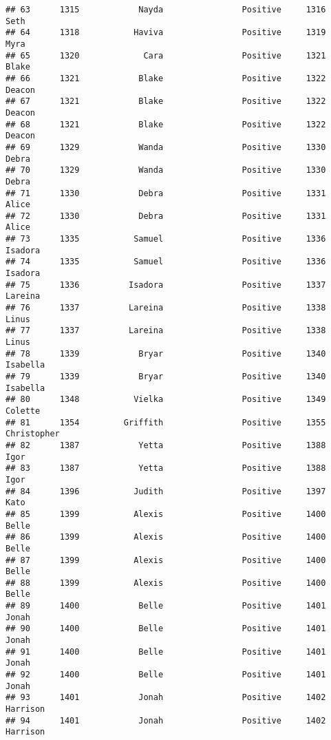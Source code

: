 \documentclass[
]{article}
\begin{document}
\begin{verbatim}
## 63      1315            Nayda                Positive     1316             Seth
## 64      1318           Haviva                Positive     1319             Myra
## 65      1320             Cara                Positive     1321            Blake
## 66      1321            Blake                Positive     1322           Deacon
## 67      1321            Blake                Positive     1322           Deacon
## 68      1321            Blake                Positive     1322           Deacon
## 69      1329            Wanda                Positive     1330            Debra
## 70      1329            Wanda                Positive     1330            Debra
## 71      1330            Debra                Positive     1331            Alice
## 72      1330            Debra                Positive     1331            Alice
## 73      1335           Samuel                Positive     1336          Isadora
## 74      1335           Samuel                Positive     1336          Isadora
## 75      1336          Isadora                Positive     1337          Lareina
## 76      1337          Lareina                Positive     1338            Linus
## 77      1337          Lareina                Positive     1338            Linus
## 78      1339            Bryar                Positive     1340         Isabella
## 79      1339            Bryar                Positive     1340         Isabella
## 80      1348           Vielka                Positive     1349          Colette
## 81      1354         Griffith                Positive     1355      Christopher
## 82      1387            Yetta                Positive     1388             Igor
## 83      1387            Yetta                Positive     1388             Igor
## 84      1396           Judith                Positive     1397             Kato
## 85      1399           Alexis                Positive     1400            Belle
## 86      1399           Alexis                Positive     1400            Belle
## 87      1399           Alexis                Positive     1400            Belle
## 88      1399           Alexis                Positive     1400            Belle
## 89      1400            Belle                Positive     1401            Jonah
## 90      1400            Belle                Positive     1401            Jonah
## 91      1400            Belle                Positive     1401            Jonah
## 92      1400            Belle                Positive     1401            Jonah
## 93      1401            Jonah                Positive     1402         Harrison
## 94      1401            Jonah                Positive     1402         Harrison

\end{verbatim}
\end{document}
